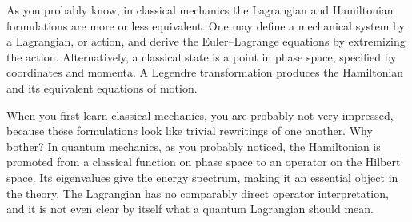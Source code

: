 As you probably know, in classical mechanics the Lagrangian and Hamiltonian
formulations are more or less equivalent. One may
define a mechanical system by a Lagrangian, or action, and derive the
Euler--Lagrange equations by extremizing the action.
Alternatively, a classical state is a point in phase space, specified by
coordinates and momenta. A Legendre transformation produces the Hamiltonian and
its equivalent equations of motion.

When you first learn classical mechanics, you are probably not very impressed,
because these formulations look like trivial rewritings of one another. Why
bother?
In quantum mechanics, as you probably noticed, the Hamiltonian is promoted from
a classical function on phase space to an operator on the Hilbert space. Its
eigenvalues give the energy spectrum, making it an essential object
in the theory. The Lagrangian has no comparably direct operator interpretation,
and it is not even clear by itself what a quantum Lagrangian should mean.

